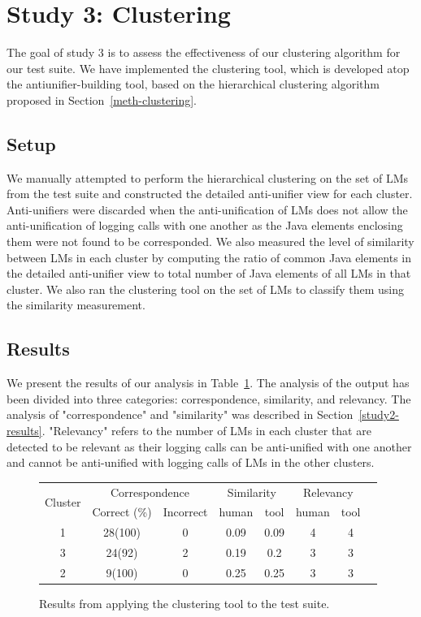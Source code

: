 \section{Study 3: Clustering}  \label{study3}
The goal of study 3 is to assess the effectiveness of our clustering algorithm for our test suite. We have implemented the clustering tool, which is developed atop the antiunifier-building tool, based on the hierarchical clustering algorithm proposed in Section~\ref{meth-clustering}.


\subsection{Setup}  \label{study3-setup}
We manually attempted to perform the hierarchical clustering on the set of LMs from the test suite and constructed the detailed anti-unifier view for each cluster. Anti-unifiers were discarded when the anti-unification of LMs does not allow the anti-unification of logging calls with one another as the Java elements enclosing them were not found to be corresponded. We also measured the level of similarity between LMs in each cluster by computing the ratio of common Java elements in the detailed anti-unifier view to total number of Java elements of all LMs in that cluster. We also ran the clustering tool on the set of LMs to classify them using the similarity measurement.

\subsection{Results}  \label{study3-results}
We present the results of our analysis in Table~\ref{results_clustering}. The analysis of the output has been divided into three categories: correspondence, similarity, and relevancy. The analysis of "correspondence" and "similarity" was described in Section~\ref{study2-results}. "Relevancy" refers to the number of LMs in each cluster that are detected to be relevant as their logging calls can be anti-unified with one another and cannot be anti-unified with logging calls of LMs in the other clusters.

\begin{figure}
  \centering
  \begin{tabular}{|c|c|c|c|c|c|c|c|}
    \hline

    \multirow{2}{*}{Cluster}&\multicolumn{2}{c|}{Correspondence}&\multicolumn{2}{c|}{Similarity}&\multicolumn{2}{c|}{Relevancy}\\
    \cline{2-7}
    &Correct (\%)&Incorrect&human&tool&human&tool\\
    \hline
    1&28(100)&0&0.09&0.09  &4&4\\
    \hline
    3&24(92)&2&0.19&0.2& 3&3\\
    \hline
      2&9(100)&0&0.25&0.25& 3&3\\
 	\hline
  \end{tabular}
  \caption{Results from applying the clustering tool to the test suite.}
  \label{results_clustering}
\end{figure}


